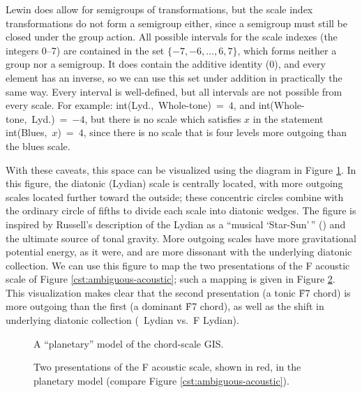 Lewin does allow for semigroups of transformations, but the scale index
transformations do not form a semigroup either, since a semigroup must still
be closed under the group action. All possible intervals for the scale indexes
(the integers 0--7) are contained in the set $\{-7, -6, \ldots, 6, 7\}$, which
forms neither a group nor a semigroup. It does contain the additive identity
($0$), and every element has an inverse, so we can use this set under addition
in practically the same way. Every interval is well-defined, but all intervals
are not possible from every scale. For example: \mbox{int(Lyd., Whole-tone) =
  $4$}, and \mbox{int(Whole-tone, Lyd.) = $-4$}, but there is no scale which
satisfies $x$ in the statement \mbox{int(Blues, $x$) = $4$}, since there is no
scale that is four levels more outgoing than the blues scale.

With these caveats, this space can be visualized using the diagram in Figure
\ref{cst:polar-gis}. In this figure, the diatonic (Lydian) scale is centrally
located, with more outgoing scales located further toward the outside; these
concentric circles combine with the ordinary circle of fifths to divide each
scale into diatonic wedges. The figure is inspired by Russell's
description of the Lydian as a ``musical `Star-Sun'\,'' () and the
ultimate source of tonal gravity. More outgoing scales have more gravitational
potential energy, as it were, and are more dissonant with the underlying
diatonic collection. We can use this figure to map the two presentations of
the F acoustic scale of Figure \ref{cst:ambiguous-acoustic}; such a mapping is
given in Figure \ref{cst:polar-acoustic}. This visualization makes clear that
the second presentation (a tonic \h{F7} chord) is more outgoing than the first
(a dominant \h{F7} chord), as well as the shift in underlying diatonic
collection (\Eflat\ Lydian vs.\ F Lydian).

\begin{figure}[tbp]
  \caption{A ``planetary'' model of the chord-scale \textsc{GIS}.}
  \label{cst:polar-gis}
\end{figure}

\begin{figure}[tbp]
  \caption[Two presentations of the F acoustic scale in the planetary
  model.]{Two presentations of the F acoustic scale, shown in red, in the
    planetary model (compare Figure \ref{cst:ambiguous-acoustic}).}
  \label{cst:polar-acoustic}
\end{figure}

